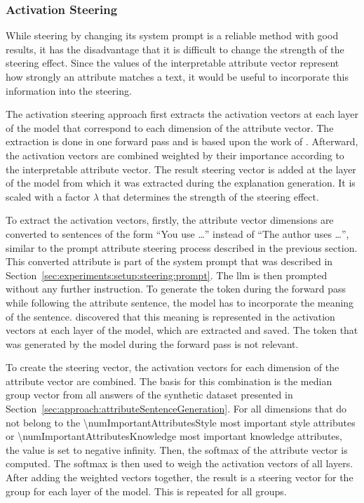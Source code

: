 \subsubsection{Activation Steering}
\label{sec:experiments:setup:steering:activation}
While steering  by changing its system prompt is a reliable method with good results, it has the disadvantage that it is difficult to change the strength of the steering effect. Since the values of the interpretable attribute vector represent how strongly an attribute matches a text, it would be useful to incorporate this information into the steering.

The activation steering approach first extracts the activation vectors at each layer of the model that correspond to each dimension of the attribute vector. The extraction is done in one forward pass and is based upon the work of \citet{konenStyleVectorsSteering2024}. %
Afterward, the activation vectors are combined weighted by their importance according to the interpretable attribute vector. The result steering vector is added at the layer of the model from which it was extracted during the explanation generation. It is scaled with a factor \(\lambda\) that determines the strength of the steering effect.

To extract the activation vectors, firstly, the attribute vector dimensions are converted to sentences of the form \enquote{You use \ldots} instead of \enquote{The author uses \ldots}, similar to the prompt attribute steering process described in the previous section. This converted attribute is part of the system prompt that was described in Section~\ref{sec:experiments:setup:steering:prompt}. The \ac{llm} is then prompted without any further instruction. To generate the token during the forward pass while following the attribute sentence, the model has to incorporate the meaning of the sentence. \citet{konenStyleVectorsSteering2024} discovered that this meaning is represented in the activation vectors at each layer of the model, which are extracted and saved. The token that was generated by the model during the forward pass is not relevant.

To create the steering vector, the activation vectors for each dimension of the attribute vector are combined. The basis for this combination is the median group vector from all answers of the synthetic dataset presented in Section~\ref{sec:approach:attributeSentenceGeneration}. For all dimensions that do not belong to the \num{\numImportantAttributesStyle} most important style attributes or \num{\numImportantAttributesKnowledge} most important knowledge attributes, the value is set to negative infinity. Then, the softmax of the attribute vector is computed. The softmax is then used to weigh the activation vectors of all layers. After adding the weighted vectors together, the result is a steering vector for the group for each layer of the model. This is repeated for all groups.
